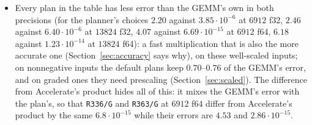 \documentclass[11pt]{article}
\newcommand{\lv}[1]{\texttt{#1}}
\begin{document}
\begin{itemize}
  ($0.0706$~s, $1.38\times$, $0.69$) and the planner's choice without a
  budget; under the default budget the tie rule takes \lv{R363/G4},
  predicted $2.1\%$ slower and $18\%$ more accurate, which measured $1.3\%$
  slower with $0.84$ of the error.  Only the three-level \lv{SW/D48+2/D48/G6}
  stays near the GEMM's error ($0.86$--$1.06\times$ over $6912$ and $13824$; above it only at $6912$ f64), and it is slow except
  at $13824$ f64.
\item Every plan in the table has less error than the GEMM's own
  in both precisions (for the planner's choices $2.20$ against
  $3.85\cdot10^{-6}$ at $6912$ f32, $2.46$ against $6.40\cdot10^{-6}$ at
  $13824$ f32, $4.07$ against $6.69\cdot10^{-15}$ at $6912$ f64, $6.18$
  against $1.23\cdot10^{-14}$ at $13824$ f64): a fast multiplication that is
  also the more accurate one (Section~\ref{sec:accuracy} says why), on
  these well-scaled inputs; on nonnegative inputs the default plans keep $0.70$--$0.76$ of the GEMM's error,
  and on graded ones they need prescaling
  (Section~\ref{sec:scaled}).  The
  difference from Accelerate's product hides all of this: it mixes the GEMM's error with the plan's, so that \lv{R336/G} and \lv{R363/G} at $6912$ f64 differ from Accelerate's product by the same $6.8\cdot10^{-15}$ while their errors are $4.53$ and $2.86\cdot10^{-15}$.
\end{itemize}
\end{document}
